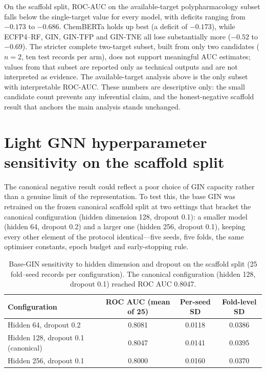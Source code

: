 \documentclass[11pt,a4paper]{article}
\begin{document}
On the scaffold split, ROC-AUC on the available-target polypharmacology subset falls below the single-target value for every model, with deficits ranging from $-\num{0.173}$ to $-\num{0.686}$. ChemBERTa holds up best (a deficit of $-\num{0.173}$), while ECFP4--RF, GIN, GIN-TFP and GIN-TNE all lose substantially more ($-\num{0.52}$ to $-\num{0.69}$). The stricter complete two-target subset, built from only two candidates ($n=2$, ten test records per arm), does not support meaningful AUC estimates; values from that subset are reported only as technical outputs and are not interpreted as evidence. The available-target analysis above is the only subset with interpretable ROC-AUC. These numbers are descriptive only: the small candidate count prevents any inferential claim, and the honest-negative scaffold result that anchors the main analysis stands unchanged.

\section{Light GNN hyperparameter sensitivity on the scaffold split}
\label{sec:gnn_sensitivity_si}

The canonical negative result could reflect a poor choice of GIN capacity rather than a genuine limit of the representation. To test this, the base GIN was retrained on the frozen canonical scaffold split at two settings that bracket the canonical configuration (hidden dimension \num{128}, dropout \num{0.1}): a smaller model (hidden \num{64}, dropout \num{0.2}) and a larger one (hidden \num{256}, dropout \num{0.1}), keeping every other element of the protocol identical---five seeds, five folds, the same optimiser constants, epoch budget and early-stopping rule.

\begin{table}[h]
\centering
\caption{Base-GIN sensitivity to hidden dimension and dropout on the scaffold split (\num{25} fold--seed records per configuration). The canonical configuration (hidden \num{128}, dropout \num{0.1}) reached ROC AUC \num{0.8047}.}
\label{tab:s3_gin_sensitivity}
\begin{tabular}{lccc}
\toprule
Configuration & ROC AUC (mean of \num{25}) & Per-seed SD & Fold-level SD \\
\midrule
Hidden \num{64}, dropout \num{0.2} & \num{0.8081} & \num{0.0118} & \num{0.0386} \\
Hidden \num{128}, dropout \num{0.1} (canonical) & \num{0.8047} & \num{0.0141} & \num{0.0395} \\
Hidden \num{256}, dropout \num{0.1} & \num{0.8000} & \num{0.0160} & \num{0.0370} \\
\bottomrule
\end{tabular}
\end{table}
\end{document}
